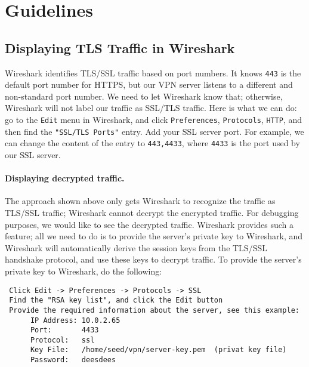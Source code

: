 \section{Guidelines}



\subsection{Displaying TLS Traffic in Wireshark}

Wireshark identifies TLS/SSL traffic based on port numbers. It knows 
\texttt{443} is the default port number for HTTPS, but our VPN server listens to a different
and non-standard
port number. We need to let Wireshark know that; otherwise, Wireshark will not label our 
traffic as SSL/TLS traffic. Here is what we can do: 
go to the \texttt{Edit} menu in Wireshark, and 
click  \texttt{Preferences}, \texttt{Protocols}, \texttt{HTTP}, and 
then find the \texttt{"SSL/TLS Ports"} entry. Add your SSL
server port. For example, we can change the content 
of the entry to  \texttt{443,4433}, where \texttt{4433} is the port used by our SSL server. 


\paragraph{Displaying decrypted traffic.} The approach shown above only 
gets Wireshark to recognize the traffic as TLS/SSL traffic; Wireshark cannot 
decrypt the encrypted traffic. For debugging purposes, we would like to see the decrypted
traffic. Wireshark provides such a feature; all we need to do is to provide the 
server's private key to Wireshark, and Wireshark will automatically 
derive the session keys from the TLS/SSL handshake protocol, and use these
keys to decrypt traffic. To provide the server's private key
to Wireshark, do the following:


\begin{lstlisting}
 Click Edit -> Preferences -> Protocols -> SSL 
 Find the "RSA key list", and click the Edit button
 Provide the required information about the server, see this example:
      IP Address: 10.0.2.65
      Port:       4433
      Protocol:   ssl
      Key File:   /home/seed/vpn/server-key.pem  (privat key file)
      Password:   deesdees
\end{lstlisting}


